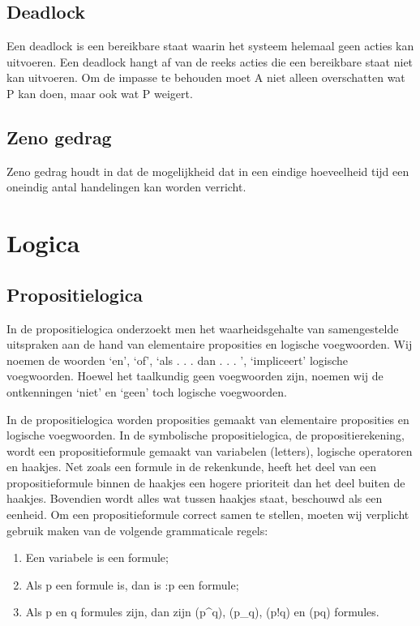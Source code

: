 \documentclass{article}
\begin{document}
	\subsection{Deadlock}
	Een deadlock is een bereikbare staat waarin het systeem   helemaal geen acties kan uitvoeren. Een deadlock hangt af van de reeks acties die een bereikbare staat niet kan uitvoeren. Om de impasse te behouden moet A niet alleen overschatten wat P kan doen, maar ook wat P weigert.
	\subsection{Zeno gedrag}
	Zeno gedrag houdt in dat de mogelijkheid dat in een eindige hoeveelheid tijd een oneindig antal handelingen kan worden verricht.
	
	
	\section{Logica}
	
	
	
	\subsection{Propositielogica}
	
	
	In de propositielogica onderzoekt men het waarheidsgehalte van samengestelde uitspraken
	aan de hand van elementaire proposities en logische voegwoorden. Wij noemen de
	woorden ‘en’, ‘of’, ‘als . . . dan . . . ’, ‘impliceert’ logische voegwoorden. Hoewel het taalkundig
	geen voegwoorden zijn, noemen wij de ontkenningen ‘niet’ en ‘geen’ toch logische
	voegwoorden.
	
	In de propositielogica worden proposities gemaakt van elementaire proposities en logische
	voegwoorden. In de symbolische propositielogica, de propositierekening, wordt een
	propositieformule gemaakt van variabelen (letters), logische operatoren en haakjes. Net
	zoals een formule in de rekenkunde, heeft het deel van een propositieformule binnen de
	haakjes een hogere prioriteit dan het deel buiten de haakjes. Bovendien wordt alles wat
	tussen haakjes staat, beschouwd als een eenheid. Om een propositieformule correct samen
	te stellen, moeten wij verplicht gebruik maken van de volgende grammaticale regels:
	\begin{enumerate}
		\item Een variabele is een formule;
		\item Als p een formule is, dan is :p een formule;
		\item Als p en q formules zijn, dan zijn (p^q), (p_q), (p!q) en (p\text{$}q) formules.
	\end{enumerate}
	
\end{document}
